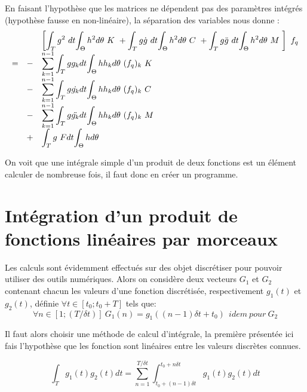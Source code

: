 En faisant l'hypothèse que les matrices ne dépendent pas des paramètres intégrés (hypothèse fausse en non-linéaire), la séparation des variables nous donne :
\begin{equation}
\begin{array}{r r l}

	&&\left[\displaystyle
	\int_T g^2~dt 			\! \int_\Theta
		h^2  d\theta ~K~
	+ \int_T g \dot{g}~dt 	\! \int_\Theta
		 h^2  d\theta ~C~ 
	+ \int_T g \ddot{g}~dt 	\! \int_\Theta
		 h^2  d\theta ~M~
			\right] ~ f_q
	\\
	= &-&
	 \displaystyle 
	 \sum_{k=1}^{n-1}
		 \int_T g g_k dt \! \int_\Theta		
			 h h_k d\theta  ~(f_q)_k ~K~
	\\
	&-&
	 \displaystyle
	 \sum_{k=1}^{n-1}
		 \int_T g \dot{g_k} dt \! \int_\Theta
		 	h h_k  d\theta  ~(f_q)_k ~C~
	\\
	&-&
	 \displaystyle
	 \sum_{k=1}^{n-1}
		 \int_T g \ddot{g_k} dt \! \int_\Theta
		 	h h_k d\theta  ~(f_q)_k ~M~
	\\
	&+&
	 \displaystyle
	 \int_T g ~F dt \! \int_\Theta
	 	h d\theta 
\end{array}
\end{equation}

On voit que une intégrale simple d'un produit de deux fonctions est un élément calculer de nombreuse fois, il faut donc en créer un programme.

\section{Intégration d'un produit de fonctions linéaires par morceaux}

Les calculs sont évidemment effectués sur des objet discrétiser pour pouvoir utiliser des outils numériques. Alors on considère deux vecteurs $G_1$ et $G_2$ contenant chacun les valeurs d'une fonction discrétisée, respectivement $g_1(t)$ et $g_2(t)$, définie $\forall t \in [t_0;t_0+T]$ tels que:  
\begin{equation}
	\forall n \in [1;(T/ \delta t)] ~G_1(n) = g_1((n-1) \delta t+t_0)
	~~	idem~pour~G_2
\end{equation}

Il faut alors choisir une méthode de calcul d'intégrale, la première présentée ici fais l'hypothèse que les fonction sont linéaires entre les valeurs discrètes connues.

\begin{equation}
	\int_T g_1(t) g_2(t) dt = \sum_{n=1}^{T/\delta t} 
							\int_{t_0+(n-1)\delta t}^{t_0+n\delta t} 
								g_1(t) g_2(t) dt 
\end{equation}

